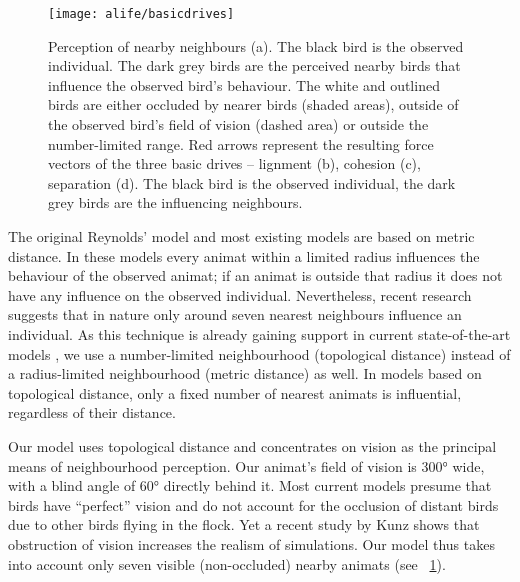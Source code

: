 \begin{figure}
  \texttt{[image: alife/basicdrives]}
  \caption{Perception of nearby neighbours (a). The black bird is the observed individual. The dark grey birds are the perceived nearby birds that influence the observed bird's behaviour. The white and outlined birds are either occluded by nearer birds (shaded areas), outside of the observed bird's field of vision (dashed area) or outside the number-limited range. Red arrows represent the resulting force vectors of the three basic drives -- lignment (b), cohesion (c), separation (d). The black bird is the observed individual, the dark grey birds are the influencing neighbours.}
  \label{figDrives}
\end{figure}

The original Reynolds' model and most existing models are based on metric distance. In these models every animat within a limited radius influences the behaviour of the observed animat; if an animat is outside that radius it does not have any influence on the observed individual. Nevertheless, recent research \cite{ballerini2008interaction,ballerini2008empirical} suggests that in nature only around seven nearest neighbours influence an individual. As this technique is already gaining support in current state-of-the-art models \cite{hildenbrandt2010selforganized}, we use a number-limited neighbourhood (topological distance) instead of a radius-limited neighbourhood (metric distance) as well. In models based on topological distance, only a fixed number of nearest animats is influential, regardless of their distance.

Our model uses topological distance and concentrates on vision as the principal means of neighbourhood perception. Our animat's field of vision is \ang{300} wide, with a blind angle of \ang{60} directly behind it. Most current models presume that birds have ``perfect'' vision and do not account for the occlusion of distant birds due to other birds flying in the flock. Yet a recent study by Kunz\etal \cite{kunz2012simulations} shows that obstruction of vision increases the realism of simulations. Our model thus takes into account only seven visible (non-occluded) nearby animats (see \figurename~\ref{figDrives}).


